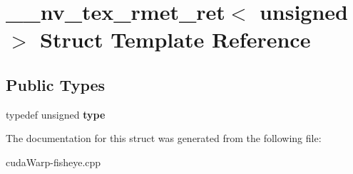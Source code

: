 \hypertarget{struct____nv__tex__rmet__ret_3_01unsigned_01_4}{}\section{\+\_\+\+\_\+nv\+\_\+tex\+\_\+rmet\+\_\+ret$<$ unsigned $>$ Struct Template Reference}
\label{struct____nv__tex__rmet__ret_3_01unsigned_01_4}
\subsection*{Public Types}
\begin{DoxyCompactItemize}
\item 
typedef unsigned {\bfseries type}\hypertarget{struct____nv__tex__rmet__ret_3_01unsigned_01_4_a29a233d7075a2ec27dfd184ae3b84058}{}\label{struct____nv__tex__rmet__ret_3_01unsigned_01_4_a29a233d7075a2ec27dfd184ae3b84058}

\end{DoxyCompactItemize}


The documentation for this struct was generated from the following file\+:\begin{DoxyCompactItemize}
\item 
cuda\+Warp-\/fisheye.\+cpp\end{DoxyCompactItemize}
